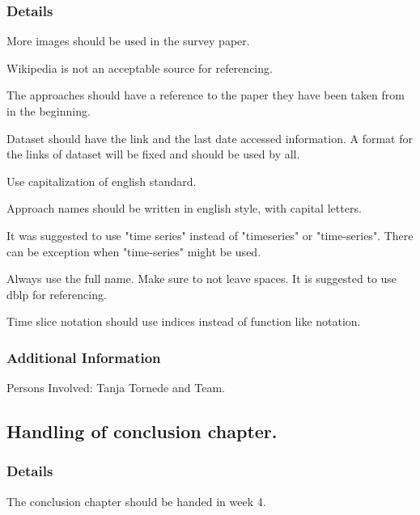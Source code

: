 \documentclass[11pt]{meetingmins} %
\begin{document}
\subsubsection{Details}
\begin{hiddensubitems}
    \item
    More images should be used in the survey paper.
    \item
    Wikipedia is not an acceptable source for referencing.
    \item
    The approaches should have a reference to the paper they
    have been taken from in the beginning.
    \item
    Dataset should have the link and the last date
    accessed information. A format for the links of dataset
    will be fixed and should be used by all.
    \item
    Use capitalization of english standard.
    \item
    Approach names should be written in english style,
    with capital letters.
    \item
    It was suggested to use "time series" instead of "timeseries"
    or "time-series". There can be exception when "time-series"
    might be used.
    \item
    Always use the full name. Make sure to not leave spaces.
    It is suggested to use dblp for referencing.
    \item
    Time slice notation should use indices instead of function like notation.
\end{hiddensubitems}

\subsubsection{Additional Information}
\begin{hiddensubitems}
    \item
    Persons Involved: Tanja Tornede and Team.
\end{hiddensubitems}

\subsection{Handling of conclusion chapter.}
\subsubsection{Details}
\begin{hiddensubitems}
    \item
    The conclusion chapter should be handed in week 4.
\end{hiddensubitems}
\end{document}
